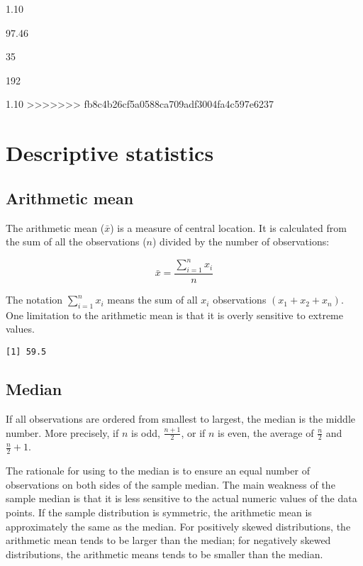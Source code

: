 \documentclass[]{book}
\newenvironment{Shaded}{\begin{snugshade}}{\end{snugshade}}
\newcommand{\KeywordTok}[1]{\textcolor[rgb]{0.13,0.29,0.53}{\textbf{#1}}}
\newcommand{\StringTok}[1]{\textcolor[rgb]{0.31,0.60,0.02}{#1}}
\newcommand{\CommentTok}[1]{\textcolor[rgb]{0.56,0.35,0.01}{\textit{#1}}}
\newcommand{\OperatorTok}[1]{\textcolor[rgb]{0.81,0.36,0.00}{\textbf{#1}}}
\newcommand{\NormalTok}[1]{#1}
\theoremstyle{definition}
\theoremstyle{definition}
\theoremstyle{definition}
\theoremstyle{remark}
\begin{document}
1.10

97.46

35

192

1.10
>>>>>>> fb8c4b26cf5a0588ca709adf3004fa4c597e6237

\chapter{Descriptive statistics}\label{descriptive-statistics}

\section{Arithmetic mean}\label{arithmetic-mean}

The arithmetic mean (\(\bar{x}\)) is a measure of central location. It
is calculated from the sum of all the observations (\({n}\)) divided by
the number of observations:

\[\bar{x}=\frac{\sum_{i=1}^nx_{i}}{n}\]

The notation \(\sum_{i=1}^nx_{i}\) means the sum of all \({x}_i\)
observations \(({x}_1+{x}_2+{x}_n)\). One limitation to the arithmetic
mean is that it is overly sensitive to extreme values.

\begin{Shaded}
\end{Shaded}

\begin{verbatim}
[1] 59.5
\end{verbatim}

\section{Median}\label{median}

If all observations are ordered from smallest to largest, the median is
the middle number. More precisely, if \({n}\) is odd, \(\frac{n+1}{2}\),
or if \({n}\) is even, the average of \(\frac{n}{2}\) and
\(\frac{n}{2}+1\).

The rationale for using to the median is to ensure an equal number of
observations on both sides of the sample median. The main weakness of
the sample median is that it is less sensitive to the actual numeric
values of the data points. If the sample distribution is symmetric, the
arithmetic mean is approximately the same as the median. For positively
skewed distributions, the arithmetic mean tends to be larger than the
median; for negatively skewed distributions, the arithmetic means tends
to be smaller than the median.
\end{document}
